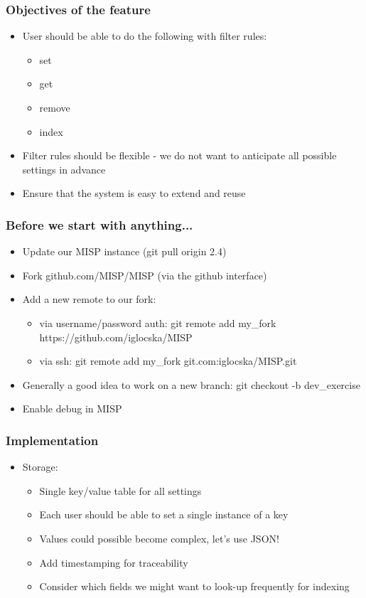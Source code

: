 \begin{frame}
  \frametitle{Objectives of the feature}
  \begin{itemize}
    \item User should be able to do the following with filter rules:
    \begin{itemize}
      \item set
      \item get
      \item remove
      \item index
    \end{itemize}
    \item Filter rules should be flexible - we do not want to anticipate all possible settings in advance
    \item Ensure that the system is easy to extend and reuse
  \end{itemize}
\end{frame}

\begin{frame}
  \frametitle{Before we start with anything...}
  \begin{itemize}
    \item Update our MISP instance (git pull origin 2.4)
    \item Fork github.com/MISP/MISP (via the github interface)
    \item Add a new remote to our fork:
    \begin{itemize}
      \item via username/password auth: git remote add my\_fork https://github.com/iglocska/MISP
      \item via ssh: git remote add my\_fork git\@github.com:iglocska/MISP.git
    \end{itemize}
    \item Generally a good idea to work on a new branch: git checkout -b dev\_exercise
    \item Enable debug in MISP
  \end{itemize}
\end{frame}

\begin{frame}
  \frametitle{Implementation}
  \begin{itemize}
    \item Storage:
    \begin{itemize}
      \item Single key/value table for all settings
      \item Each user should be able to set a single instance of a key
      \item Values could possible become complex, let's use JSON!
      \item Add timestamping for traceability
      \item Consider which fields we might want to look-up frequently for indexing
    \end{itemize}
  \end{itemize}
\end{frame}

